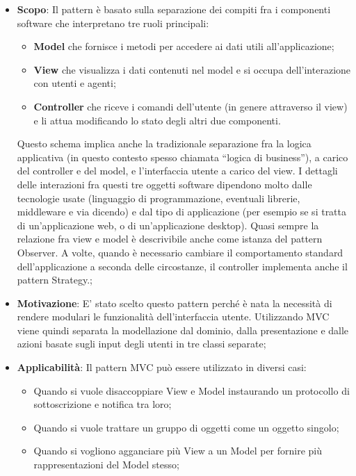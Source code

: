 		\begin{itemize}
			\item \textbf{Scopo}: Il pattern è basato sulla separazione dei compiti fra i componenti software che interpretano tre ruoli principali:
			
		\begin{itemize}
			\item \textbf{Model} che fornisce i metodi per accedere ai dati utili all'applicazione;
			\item \textbf{View} che visualizza i dati contenuti nel model e si occupa dell'interazione con utenti e agenti;
			\item \textbf{Controller} che riceve i comandi dell'utente (in genere attraverso il view) e li attua modificando lo stato degli altri due componenti.
		\end{itemize}
		
		\noindent
		Questo schema implica anche la tradizionale separazione fra la logica applicativa (in questo contesto spesso chiamata ``logica di business''), a carico del controller e del model, e l'interfaccia utente a carico del view. I dettagli delle interazioni fra questi tre oggetti software dipendono molto dalle tecnologie usate (linguaggio di programmazione, eventuali librerie, middleware e via dicendo) e dal tipo di applicazione (per esempio se si tratta di un'applicazione web, o di un'applicazione desktop). Quasi sempre la relazione fra view e model è descrivibile anche come istanza del pattern Observer. A volte, quando è necessario cambiare il comportamento standard dell'applicazione a seconda delle circostanze, il controller implementa anche il pattern Strategy.;
			
			\item \textbf{Motivazione}: E' stato scelto questo pattern perché è nata la necessità di rendere modulari le funzionalità dell'interfaccia utente. Utilizzando MVC viene quindi separata la modellazione dal dominio, dalla presentazione e dalle azioni basate sugli input degli utenti in tre classi separate;
			
			\item \textbf{Applicabilità}: Il pattern MVC può essere utilizzato in diversi casi:
			
			\begin{itemize}
			\item  Quando si vuole disaccoppiare View e Model instaurando un protocollo di sottoscrizione e notifica tra loro;
			\item Quando si vuole trattare un gruppo di oggetti come un oggetto singolo;
			\item Quando si vogliono agganciare più View a un Model per fornire più rappresentazioni del Model stesso;
			\end{itemize}

		\end{itemize}	
				
